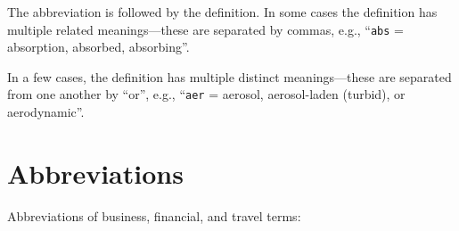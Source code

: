\documentclass[12pt,twoside]{article}
\begin{document}
The abbreviation is followed by the definition.
In some cases the definition has multiple related meanings---these are
separated by commas, e.g., ``\verb'abs' = absorption, absorbed, absorbing''.

In a few cases, the definition has multiple distinct meanings---these
are separated from one another by ``or'', e.g., 
``\verb'aer' = aerosol, aerosol-laden (turbid), or aerodynamic''.

\section{Abbreviations}\label{sxn:abb}

\hypertarget{sxn:abb}{}
Abbreviations of business, financial, and travel terms:
\end{document}
